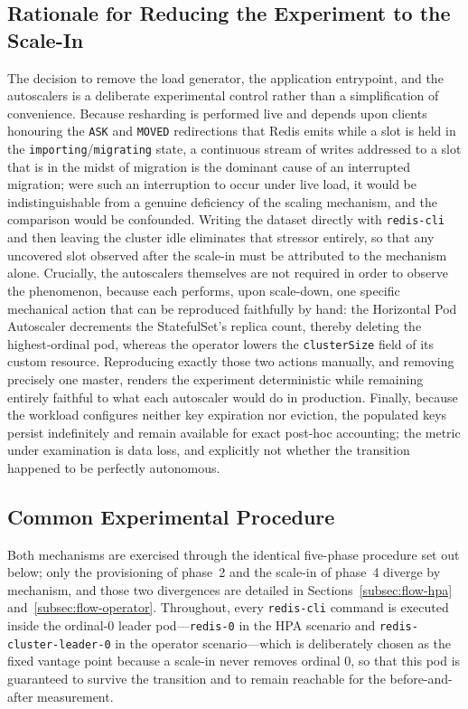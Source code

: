 \subsection{Rationale for Reducing the Experiment to the Scale-In}\label{subsec:flow-rationale}

The decision to remove the load generator, the application entrypoint, and the autoscalers
is a deliberate experimental control rather than a simplification of convenience. Because
resharding is performed live and depends upon clients honouring the \texttt{ASK} and
\texttt{MOVED} redirections that Redis emits while a slot is held in the
\texttt{importing}/\texttt{migrating} state, a continuous stream of writes addressed to a
slot that is in the midst of migration is the dominant cause of an interrupted migration;
were such an interruption to occur under live load, it would be indistinguishable from a
genuine deficiency of the scaling mechanism, and the comparison would be confounded.
Writing the dataset directly with \texttt{redis-cli} and then leaving the cluster idle
eliminates that stressor entirely, so that any uncovered slot observed after the scale-in
must be attributed to the mechanism alone. Crucially, the autoscalers themselves are not
required in order to observe the phenomenon, because each performs, upon scale-down, one
specific mechanical action that can be reproduced faithfully by hand: the Horizontal Pod
Autoscaler decrements the StatefulSet's replica count, thereby deleting the highest-ordinal
pod, whereas the operator lowers the \texttt{clusterSize} field of its custom resource.
Reproducing exactly those two actions manually, and removing precisely one master, renders
the experiment deterministic while remaining entirely faithful to what each autoscaler
would do in production. Finally, because the workload configures neither key expiration nor
eviction, the populated keys persist indefinitely and remain available for exact post-hoc
accounting; the metric under examination is data loss, and explicitly not whether the
transition happened to be perfectly autonomous.

\subsection{Common Experimental Procedure}\label{subsec:flow-procedure}

Both mechanisms are exercised through the identical five-phase procedure set out below;
only the provisioning of phase~2 and the scale-in of phase~4 diverge by mechanism, and
those two divergences are detailed in Sections~\ref{subsec:flow-hpa}
and~\ref{subsec:flow-operator}. Throughout, every \texttt{redis-cli} command is executed
inside the ordinal-$0$ leader pod---\texttt{redis-0} in the HPA scenario and
\texttt{redis-cluster-leader-0} in the operator scenario---which is deliberately chosen as
the fixed vantage point because a scale-in never removes ordinal $0$, so that this pod is
guaranteed to survive the transition and to remain reachable for the before-and-after
measurement.

